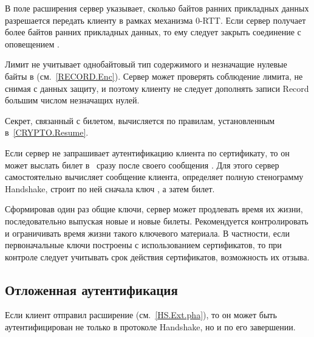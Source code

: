 В поле  расширения  
сервер указывает, сколько байтов ранних прикладных данных разрешается передать 
клиенту в рамках механизма \mbox{0-RTT}. 
%
Если сервер получает более  байтов ранних прикладных
данных, то ему следует закрыть соединение с оповещением
.

Лимит  не учитывает однобайтовый тип содержимого и 
незначащие нулевые байты в  (см.~\ref{RECORD.Enc}).
%
Сервер может проверять соблюдение лимита, не снимая с данных защиту, и поэтому 
клиенту не следует дополнять записи Record большим числом незначащих нулей.

Секрет, связанный с билетом, вычисляется по правилам, установленным 
в~\ref{CRYPTO.Resume}.

\begin{note}
Если сервер не запрашивает аутентификацию клиента по сертификату, то он может 
выслать билет в~ сразу после своего сообщения 
.
%
Для этого сервер самостоятельно вычисляет сообщение 
 клиента, определяет полную стенограмму Handshake, 
строит по ней сначала ключ , а затем билет.
\end{note}



\begin{note}
Сформировав один раз общие ключи, сервер может продлевать время их жизни, 
последовательно выпуская новые и новые билеты. Рекомендуется контролировать и 
ограничивать время жизни такого ключевого материала. 
%
В частности, если первоначальные ключи построены с использованием сертификатов, 
то при контроле следует учитывать срок действия сертификатов,  
возможность их отзыва. 
\end{note}

\subsection{Отложенная аутентификация}\label{HS.Post.Auth} 

Если клиент отправил расширение  
(см.~\ref{HS.Ext.pha}), то он может быть аутентифицирован не только в протоколе 
Handshake, но и по его завершении.


